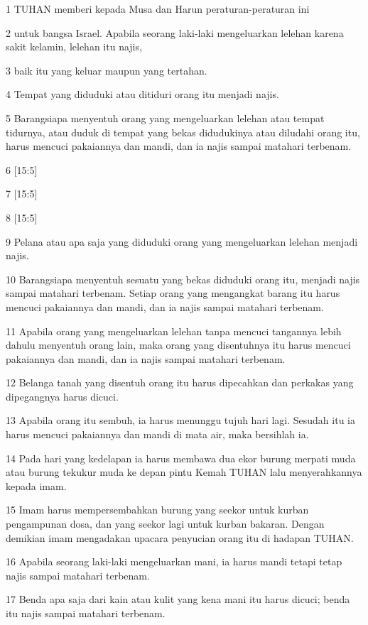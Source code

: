 \par 1 TUHAN memberi kepada Musa dan Harun peraturan-peraturan ini
\par 2 untuk bangsa Israel. Apabila seorang laki-laki mengeluarkan lelehan karena sakit kelamin, lelehan itu najis,
\par 3 baik itu yang keluar maupun yang tertahan.
\par 4 Tempat yang diduduki atau ditiduri orang itu menjadi najis.
\par 5 Barangsiapa menyentuh orang yang mengeluarkan lelehan atau tempat tidurnya, atau duduk di tempat yang bekas didudukinya atau diludahi orang itu, harus mencuci pakaiannya dan mandi, dan ia najis sampai matahari terbenam.
\par 6 [15:5]
\par 7 [15:5]
\par 8 [15:5]
\par 9 Pelana atau apa saja yang diduduki orang yang mengeluarkan lelehan menjadi najis.
\par 10 Barangsiapa menyentuh sesuatu yang bekas diduduki orang itu, menjadi najis sampai matahari terbenam. Setiap orang yang mengangkat barang itu harus mencuci pakaiannya dan mandi, dan ia najis sampai matahari terbenam.
\par 11 Apabila orang yang mengeluarkan lelehan tanpa mencuci tangannya lebih dahulu menyentuh orang lain, maka orang yang disentuhnya itu harus mencuci pakaiannya dan mandi, dan ia najis sampai matahari terbenam.
\par 12 Belanga tanah yang disentuh orang itu harus dipecahkan dan perkakas yang dipegangnya harus dicuci.
\par 13 Apabila orang itu sembuh, ia harus menunggu tujuh hari lagi. Sesudah itu ia harus mencuci pakaiannya dan mandi di mata air, maka bersihlah ia.
\par 14 Pada hari yang kedelapan ia harus membawa dua ekor burung merpati muda atau burung tekukur muda ke depan pintu Kemah TUHAN lalu menyerahkannya kepada imam.
\par 15 Imam harus mempersembahkan burung yang seekor untuk kurban pengampunan dosa, dan yang seekor lagi untuk kurban bakaran. Dengan demikian imam mengadakan upacara penyucian orang itu di hadapan TUHAN.
\par 16 Apabila seorang laki-laki mengeluarkan mani, ia harus mandi tetapi tetap najis sampai matahari terbenam.
\par 17 Benda apa saja dari kain atau kulit yang kena mani itu harus dicuci; benda itu najis sampai matahari terbenam.
